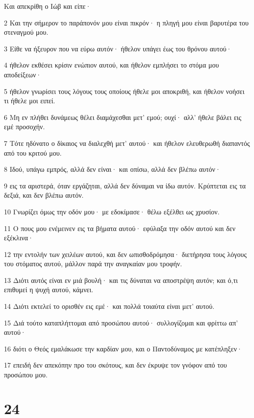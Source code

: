 \par Και απεκρίθη ο Ιώβ και είπε·
\par 2 Και την σήμερον το παράπονόν μου είναι πικρόν· η πληγή μου είναι βαρυτέρα του στεναγμού μου.
\par 3 Είθε να ήξευρον που να εύρω αυτόν· ήθελον υπάγει έως του θρόνου αυτού·
\par 4 ήθελον εκθέσει κρίσιν ενώπιον αυτού, και ήθελον εμπλήσει το στόμα μου αποδείξεων·
\par 5 ήθελον γνωρίσει τους λόγους τους οποίους ήθελε μοι αποκριθή, και ήθελον νοήσει τι ήθελε μοι ειπεί.
\par 6 Μη εν πλήθει δυνάμεως θέλει διαμάχεσθαι μετ' εμού; ουχί· αλλ' ήθελε βάλει εις εμέ προσοχήν.
\par 7 Τότε ηδύνατο ο δίκαιος να διαλεχθή μετ' αυτού· και ήθελον ελευθερωθή διαπαντός από του κριτού μου.
\par 8 Ιδού, υπάγω εμπρός, αλλά δεν είναι· και οπίσω, αλλά δεν βλέπω αυτόν·
\par 9 εις τα αριστερά, όταν εργάζηται, αλλά δεν δύναμαι να ίδω αυτόν. Κρύπτεται εις τα δεξιά, και δεν βλέπω αυτόν.
\par 10 Γνωρίζει όμως την οδόν μου· με εδοκίμασε· θέλω εξέλθει ως χρυσίον.
\par 11 Ο πους μου ενέμεινεν εις τα βήματα αυτού· εφύλαξα την οδόν αυτού και δεν εξέκλινα·
\par 12 την εντολήν των χειλέων αυτού, και δεν ωπισθοδρόμησα· διετήρησα τους λόγους του στόματος αυτού, μάλλον παρά την αναγκαίαν μου τροφήν.
\par 13 Διότι αυτός είναι εν μιά βουλή· και τις δύναται να αποστρέψη αυτόν; και ό,τι επιθυμεί η ψυχή αυτού, κάμνει.
\par 14 Διότι εκτελεί το ορισθέν εις εμέ· και πολλά τοιαύτα είναι μετ' αυτού.
\par 15 Διά τούτο καταπλήττομαι από προσώπου αυτού· συλλογίζομαι και φρίττω απ' αυτού·
\par 16 διότι ο Θεός εμαλάκωσε την καρδίαν μου, και ο Παντοδύναμος με κατέπληξεν·
\par 17 επειδή δεν απεκόπην προ του σκότους, και δεν έκρυψε τον γνόφον από του προσώπου μου.

\chapter{24}

